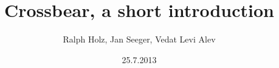 \documentclass[t]{beamer}
\title[Crossbear: A short introduction]{Crossbear, a short introduction}
\author[Ralph Holz, Jan Seeger, Vedat Levi Alev]{Ralph Holz, Jan Seeger, Vedat Levi Alev}
\institute{Network Architectures and Services \\ Technische Universität München}
\date{25.7.2013}
\begin{document}
\begin{frame}
  \titlepage
\end{frame}



\end{document}
